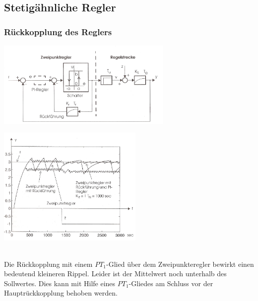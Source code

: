 	\subsection{Stetigähnliche Regler}
		\subsubsection{Rückkopplung des Reglers}
		\begin{minipage}{9cm}
		\includegraphics[width=8.5cm]{./bilder/ZweipunktreglerMitRueckfuehrung.jpg}
        \end{minipage}
		\begin{minipage}{7.5cm}
        \includegraphics[width=7cm]{./bilder/ZweipunktreglerMitRueckfuehrung_dia.jpg}
        \end{minipage}\\
		Die Rückkopplung mit einem $PT_1$-Glied über dem Zweipunkteregler bewirkt
		einen bedeutend kleineren Rippel. Leider ist der Mittelwert noch unterhalb des
		Sollwertes. Dies kann mit Hilfe eines $PT_1$-Gliedes am Schluss vor der
		Hauptrückkopplung behoben werden.
	
